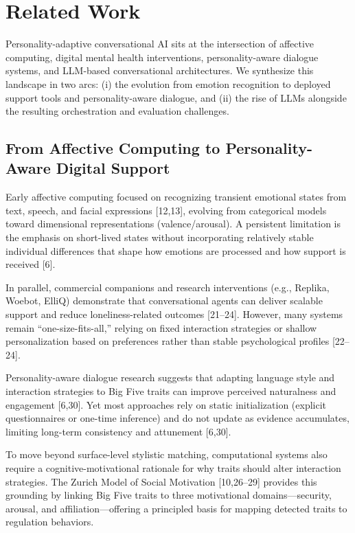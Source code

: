 \section{Related Work}\label{related-work}

Personality-adaptive conversational AI sits at the intersection of affective computing, digital mental health interventions, personality-aware dialogue systems, and LLM-based conversational architectures. We synthesize this landscape in two arcs: (i) the evolution from emotion recognition to deployed support tools and personality-aware dialogue, and (ii) the rise of LLMs alongside the resulting orchestration and evaluation challenges.

\subsection{From Affective Computing to Personality-Aware Digital Support}\label{from-affective-computing-to-personality-aware-digital-support}

Early affective computing focused on recognizing transient emotional states from text, speech, and facial expressions {[}12,13{]}, evolving from categorical models toward dimensional representations (valence/arousal). A persistent limitation is the emphasis on short-lived states without incorporating relatively stable individual differences that shape how emotions are processed and how support is received {[}6{]}.

In parallel, commercial companions and research interventions (e.g., Replika, Woebot, ElliQ) demonstrate that conversational agents can deliver scalable support and reduce loneliness-related outcomes {[}21--24{]}. However, many systems remain ``one-size-fits-all,'' relying on fixed interaction strategies or shallow personalization based on preferences rather than stable psychological profiles {[}22--24{]}.

Personality-aware dialogue research suggests that adapting language style and interaction strategies to Big Five traits can improve perceived naturalness and engagement {[}6,30{]}. Yet most approaches rely on static initialization (explicit questionnaires or one-time inference) and do not update as evidence accumulates, limiting long-term consistency and attunement {[}6,30{]}.

To move beyond surface-level stylistic matching, computational systems also require a cognitive-motivational rationale for why traits should alter interaction strategies. The Zurich Model of Social Motivation {[}10,26--29{]} provides this grounding by linking Big Five traits to three motivational domains---security, arousal, and affiliation---offering a principled basis for mapping detected traits to regulation behaviors.

